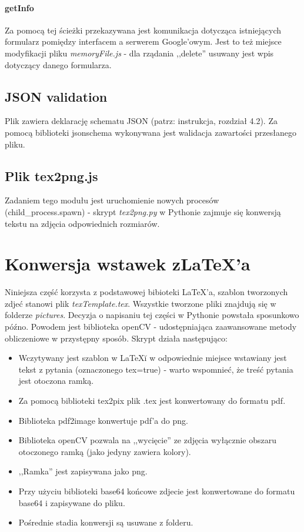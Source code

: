 \paragraph{getInfo} Za pomocą tej ścieżki  przekazywana jest komunikacja dotycząca istniejących formularz pomiędzy interfacem a serwerem Google'owym. Jest to też miejsce modyfikacji pliku \textit{memoryFile.js} - dla rządania ,,delete'' usuwany jest wpis dotyczący danego formularza.
\subsection{JSON validation} Plik zawiera deklarację schematu JSON (patrz: instrukcja, rozdział 4.2). Za pomocą biblioteki jsonschema wykonywana jest walidacja zawartości przesłanego pliku.
\subsection{Plik tex2png.js} Zadaniem tego modułu jest uruchomienie nowych procesów (child\_process.spawn)  - skrypt \textit{tex2png.py} w Pythonie zajmuje się konwersją tekstu na zdjęcia odpowiednich rozmiarów.
\section{Konwersja wstawek z\LaTeX{}'a}
Niniejsza część korzysta z podstawowej bibioteki \LaTeX{}'a, szablon tworzonych zdjeć stanowi plik \textit{texTemplate.tex}. Wszystkie tworzone pliki znajdują się w folderze \textit{pictures}.
\ind Decyzja o napisaniu tej części w Pythonie powstała sposunkowo późno. Powodem jest biblioteka openCV - udostępniająca zaawansowane metody obliczeniowe w przystępny sposób. Skrypt działa następująco:
\begin{itemize}
\item Wczytywany jest szablon w \LaTeX{}\u i w odpowiednie miejsce wstawiany jest tekst z pytania (oznaczonego tex=true) - warto wspomnieć, że treść pytania jest otoczona ramką.
\item Za pomocą biblioteki tex2pix plik .tex jest konwertowany do formatu pdf.
\item Biblioteka pdf2image konwertuje pdf'a do png.
\item Biblioteka openCV pozwala na ,,wycięcie'' ze zdjęcia wyłącznie obszaru otoczonego ramką (jako jedyny zawiera kolory).
\item ,,Ramka'' jest zapisywana jako png.
\item Przy użyciu biblioteki base64 końcowe zdjecie jest konwertowane do formatu base64 i zapisywane do pliku.
\item Pośrednie stadia konwersji są usuwane z folderu.
\end{itemize}
